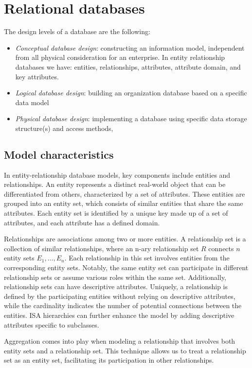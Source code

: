 \section{Relational databases}

The design levels of a database are the following: 
\begin{itemize}
    \item \textit{Conceptual database design}: constructing an information model, independent from all physical consideration for an enterprise.
        In entity relationship databases we have: entities, relationships, attributes, attribute domain, and key attributes. 
    \item \textit{Logical database design}: building an organization database based on a specific data model
    \item \textit{Physical database design}: implementing a database using specific data storage structure(s) and access methods,
\end{itemize}

\subsection{Model characteristics}
In entity-relationship database models, key components include entities and relationships. 
An entity represents a distinct real-world object that can be differentiated from others, characterized by a set of attributes. 
These entities are grouped into an entity set, which consists of similar entities that share the same attributes. 
Each entity set is identified by a unique key made up of a set of attributes, and each attribute has a defined domain.

Relationships are associations among two or more entities. A relationship set is a collection of similar relationships, where an n-ary relationship set $R$ connects $n$ entity sets $E_1,\dots,E_n$. 
Each relationship in this set involves entities from the corresponding entity sets. 
Notably, the same entity set can participate in different relationship sets or assume various roles within the same set. 
Additionally, relationship sets can have descriptive attributes. 
Uniquely, a relationship is defined by the participating entities without relying on descriptive attributes, while the cardinality indicates the number of potential connections between the entities. 
ISA hierarchies can further enhance the model by adding descriptive attributes specific to subclasses.

Aggregation comes into play when modeling a relationship that involves both entity sets and a relationship set. 
This technique allows us to treat a relationship set as an entity set, facilitating its participation in other relationships.

